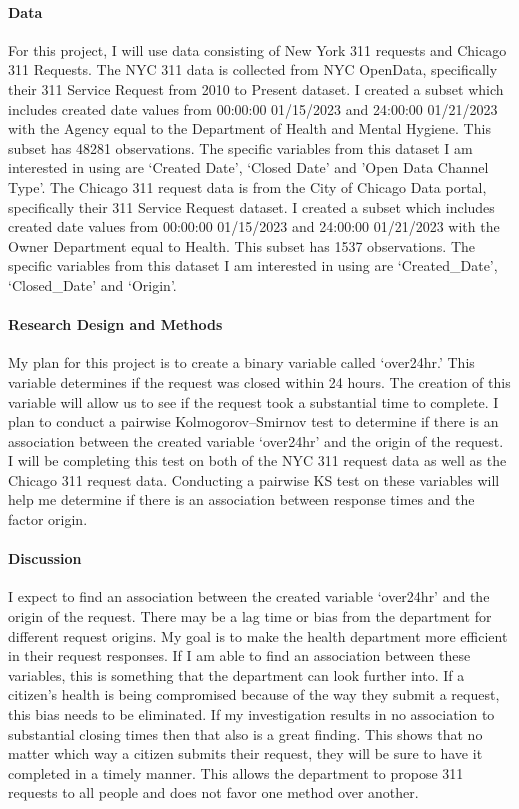 \documentclass[12pt]{article}
\begin{document}
\paragraph{Data}
For this project, I will use data consisting of New York 311 requests and Chicago 311 Requests. 
The NYC 311 data is collected from NYC OpenData, specifically their 311 Service Request from 2010 to Present dataset. 
I created a subset which includes created date values from 00:00:00 01/15/2023 and 24:00:00 01/21/2023 with the Agency equal to the Department of Health and Mental Hygiene. 
This subset has 48281 observations. 
The specific variables from this dataset I am interested in using are ‘Created Date’, ‘Closed Date’ and  'Open Data Channel Type'. 
The Chicago 311 request data is from the City of Chicago Data portal, specifically their 311 Service Request dataset. 
I created a subset which includes created date values from 00:00:00 01/15/2023 and 24:00:00 01/21/2023 with the Owner Department equal to Health. 
This subset has 1537 observations. 
The specific variables from this dataset I am interested in using are ‘Created_Date’, ‘Closed_Date’ and ‘Origin’. 

\paragraph{Research Design and Methods}
My plan for this project is to create a binary variable called ‘over24hr.’ 
This variable determines if the request was closed within 24 hours. 
The creation of this variable will allow us to see if the request took a substantial time to complete. 
I plan to conduct a pairwise Kolmogorov–Smirnov test to determine if there is an association between the created variable ‘over24hr’ and the origin of the request. 
I will be completing this test on both of the NYC 311 request data as well as the Chicago 311 request data. 
Conducting a pairwise KS test on these variables will help me determine if there is an association between response times and the factor origin. 


\paragraph{Discussion}
I expect to find an association between the created variable ‘over24hr’ and the origin of the request. 
There may be a lag time or bias from the department for different request origins. 
My goal is to make the health department more efficient in their request responses. 
If I am able to find an association between these variables, this is something that the department can look further into. 
If a citizen’s health is being compromised because of the way they submit a request, this bias needs to be eliminated. 
If my investigation results in no association to substantial closing times then that also is a great finding. 
This shows that no matter which way a citizen submits their request, they will be sure to have it completed in a timely manner. 
This allows the department to propose 311 requests to all people and does not favor one method over another. 
\end{document}
